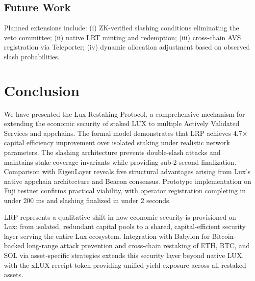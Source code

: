 \documentclass[11pt]{article}
\begin{document}
\subsection{Future Work}

Planned extensions include: (i) ZK-verified slashing conditions eliminating the veto
committee; (ii) native LRT minting and redemption; (iii) cross-chain AVS registration
via Teleporter; (iv) dynamic allocation adjustment based on observed slash probabilities.

\section{Conclusion}
\label{sec:conclusion}

We have presented the Lux Restaking Protocol, a comprehensive mechanism for extending
the economic security of staked LUX to multiple Actively Validated Services and appchains.
The formal model demonstrates that LRP achieves 4.7$\times$ capital efficiency improvement
over isolated staking under realistic network parameters. The slashing architecture
prevents double-slash attacks and maintains stake coverage invariants while providing
sub-2-second finalization. Comparison with EigenLayer reveals five structural advantages
arising from Lux's native appchain architecture and Beacon consensus. Prototype
implementation on Fuji testnet confirms practical viability, with operator registration
completing in under 200 ms and slashing finalized in under 2 seconds.

LRP represents a qualitative shift in how economic security is provisioned on Lux: from
isolated, redundant capital pools to a shared, capital-efficient security layer serving
the entire Lux ecosystem. Integration with Babylon for Bitcoin-backed long-range attack
prevention and cross-chain restaking of ETH, BTC, and SOL via asset-specific strategies
extends this security layer beyond native LUX, with the xLUX receipt token providing
unified yield exposure across all restaked assets.
\end{document}
